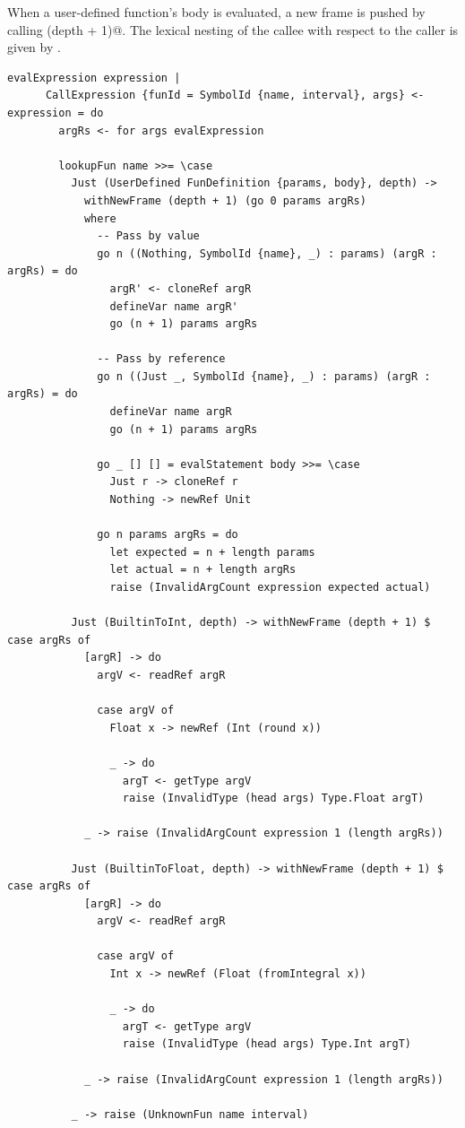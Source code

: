 \documentclass[UdineBachThesis,american,11pt,draft]{PhdThesis}
\begin{document}
  When a user-defined function's body is evaluated, a new frame is pushed by
  calling \lstinline@withNewFrame (depth + 1)@. The lexical nesting of the
  callee with respect to the caller is given by \lstinline@depth@.

  \begin{lstlisting}[gobble=4,basicstyle=\ttfamily\small]
    evalExpression expression |
      CallExpression {funId = SymbolId {name, interval}, args} <- expression = do
        argRs <- for args evalExpression

        lookupFun name >>= \case
          Just (UserDefined FunDefinition {params, body}, depth) ->
            withNewFrame (depth + 1) (go 0 params argRs)
            where
              -- Pass by value
              go n ((Nothing, SymbolId {name}, _) : params) (argR : argRs) = do
                argR' <- cloneRef argR
                defineVar name argR'
                go (n + 1) params argRs

              -- Pass by reference
              go n ((Just _, SymbolId {name}, _) : params) (argR : argRs) = do
                defineVar name argR
                go (n + 1) params argRs

              go _ [] [] = evalStatement body >>= \case
                Just r -> cloneRef r
                Nothing -> newRef Unit

              go n params argRs = do
                let expected = n + length params
                let actual = n + length argRs
                raise (InvalidArgCount expression expected actual)

          Just (BuiltinToInt, depth) -> withNewFrame (depth + 1) $ case argRs of
            [argR] -> do
              argV <- readRef argR

              case argV of
                Float x -> newRef (Int (round x))

                _ -> do
                  argT <- getType argV
                  raise (InvalidType (head args) Type.Float argT)

            _ -> raise (InvalidArgCount expression 1 (length argRs))

          Just (BuiltinToFloat, depth) -> withNewFrame (depth + 1) $ case argRs of
            [argR] -> do
              argV <- readRef argR

              case argV of
                Int x -> newRef (Float (fromIntegral x))

                _ -> do
                  argT <- getType argV
                  raise (InvalidType (head args) Type.Int argT)

            _ -> raise (InvalidArgCount expression 1 (length argRs))

          _ -> raise (UnknownFun name interval)
  \end{lstlisting}
\end{document}
